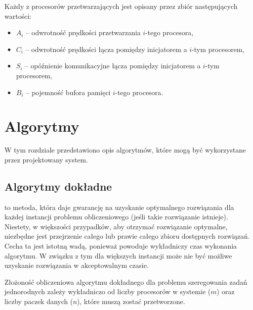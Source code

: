 Każdy z procesorów przetwarzających jest opisany przez zbiór następujących wartości:
\begin{itemize}
	\item \textbf{$A_i$} -- odwrotność prędkości przetwarzania $i$-tego procesora,
	\item \textbf{$C_i$} -- odwrotność prędkości łącza pomiędzy inicjatorem a $i$-tym procesorem,
	\item \textbf{$S_i$} -- opóźnienie komunikacyjne łącza pomiędzy inicjatorem a $i$-tym procesorem,
	\item \textbf{$B_i$} -- pojemność bufora pamięci $i$-tego procesora.
\end{itemize}


\chapter{Algorytmy}

W tym rozdziale przedstawiono opis algorytmów, które mogą być wykorzystane przez projektowany system.

\section{Algorytmy dokładne}

 to metoda, która daje gwarancję na uzyskanie optymalnego rozwiązania dla każdej instancji problemu obliczeniowego (jeśli takie rozwiązanie 
istnieje). Niestety, w większości przypadków, aby otrzymać rozwiązanie optymalne, niezbędne jest przejrzenie całego lub prawie całego zbioru dostępnych 
rozwiązań. Cecha ta jest istotną wadą, ponieważ powoduje wykładniczy czas wykonania algorytmu. W związku z tym dla większych instancji 
może nie być możliwe uzyskanie rozwiązania w akceptowalnym czasie.

Złożoność obliczeniowa algorytmu dokładnego dla problemu szeregowania zadań jednorodnych zależy wykładniczo od liczby procesorów w systemie ($m$)
oraz liczby paczek danych ($n$), które muszą zostać przetworzone.

